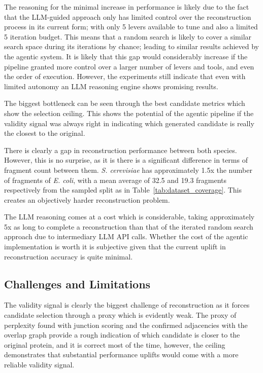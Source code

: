 \documentclass[journal]{IEEEtran}
\begin{document}
The reasoning for the minimal increase in performance is likely due to the fact that the LLM-guided
approach only has limited control over the reconstruction process in its current form; with only 5
levers available to tune and also a limited 5 iteration budget. This means that a random search is
likely to cover a similar search space during its iterations by chance; leading to similar results
achieved by the agentic system.
It is likely that this gap would considerably increase if the pipeline granted more control over a
larger number of levers and tools, and even the order of execution. However, the experiments still indicate that even with limited autonomy
an LLM reasoning engine shows promising results.

The biggest bottleneck can be seen through the best candidate metrics which show the selection ceiling.
This shows the potential of the agentic pipeline if the validity signal was always right in
indicating which generated candidate is really the closest to the original.

There is clearly a gap in reconstruction performance between both species. However, this is no surprise,
as it is there is a significant difference in terms of fragment count between them. \textit{S. cerevisiae} has
approximately 1.5x the number of fragments of \textit{E. coli}, with a mean average of 32.5 and 19.3 fragments respectively
from the sampled split as in Table~\ref{tab:dataset_coverage}. This creates an objectively harder reconstruction problem.

The LLM reasoning comes at a cost which is considerable, taking approximately 5x as long to complete a
reconstruction than that of the
iterated random search approach due to intermediary LLM API calls. Whether the cost of the agentic
implementation is worth it is subjective given that the current uplift in
reconstruction accuracy is quite minimal.

\subsection{Challenges and Limitations}
The validity signal is clearly the biggest challenge of reconstruction as it forces candidate selection through
a proxy which is evidently weak. The proxy of perplexity found
with junction scoring and the confirmed adjacencies with the overlap graph provide a rough indication
of which candidate is closer to the original protein, and it is correct most of the time, however, the ceiling
demonstrates that substantial performance uplifts would come with a more reliable validity signal.
\end{document}
